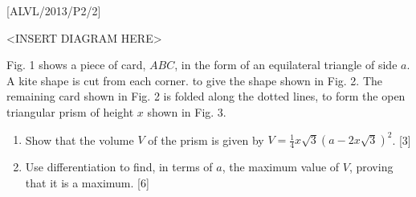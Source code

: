 \item {[}ALVL/2013/P2/2{]}
\noindent \begin{center}
<INSERT DIAGRAM HERE>
\par\end{center}

Fig. 1 shows a piece of card, $ABC$, in the form of an equilateral
triangle of side $a$. A kite shape is cut from each corner. to give
the shape shown in Fig. 2. The remaining card shown in Fig. 2 is folded
along the dotted lines, to form the open triangular prism of height
$x$ shown in Fig. 3.
\begin{enumerate}
\item Show that the volume $V$ of the prism is given by $V=\frac{1}{4}x\sqrt{3}\left(a-2x\sqrt{3}\right)^{2}$.
\hfill{} {[}3{]}
\item Use differentiation to find, in terms of $a$, the maximum value of
$V$, proving that it is a maximum. \hfill{}{[}6{]}
\end{enumerate}
